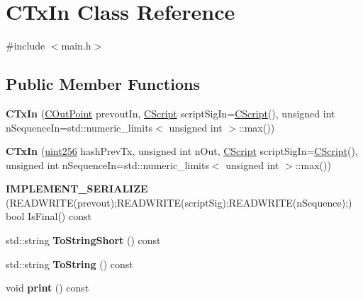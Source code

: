 \hypertarget{class_c_tx_in}{}\section{C\+Tx\+In Class Reference}
\label{class_c_tx_in}


{\ttfamily \#include $<$main.\+h$>$}

\subsection*{Public Member Functions}
\begin{DoxyCompactItemize}
\item 
\mbox{\label{class_c_tx_in_a243c4c394d5534ed10999b31d025be13}} 
{\bfseries C\+Tx\+In} (\mbox{\hyperlink{class_c_out_point}{C\+Out\+Point}} prevout\+In, \mbox{\hyperlink{class_c_script}{C\+Script}} script\+Sig\+In=\mbox{\hyperlink{class_c_script}{C\+Script}}(), unsigned int n\+Sequence\+In=std\+::numeric\+\_\+limits$<$ unsigned int $>$\+::max())
\item 
\mbox{\label{class_c_tx_in_a168382e68612df987e0241740771ab4e}} 
{\bfseries C\+Tx\+In} (\mbox{\hyperlink{classuint256}{uint256}} hash\+Prev\+Tx, unsigned int n\+Out, \mbox{\hyperlink{class_c_script}{C\+Script}} script\+Sig\+In=\mbox{\hyperlink{class_c_script}{C\+Script}}(), unsigned int n\+Sequence\+In=std\+::numeric\+\_\+limits$<$ unsigned int $>$\+::max())
\item 
\mbox{\label{class_c_tx_in_ac66b05906d62064e1161efa954994a57}} 
{\bfseries I\+M\+P\+L\+E\+M\+E\+N\+T\+\_\+\+S\+E\+R\+I\+A\+L\+I\+ZE} (R\+E\+A\+D\+W\+R\+I\+TE(prevout);R\+E\+A\+D\+W\+R\+I\+TE(script\+Sig);R\+E\+A\+D\+W\+R\+I\+TE(n\+Sequence);) bool Is\+Final() const
\item 
\mbox{\label{class_c_tx_in_aa6d16345a77762209f0d8970f6fd4429}} 
std\+::string {\bfseries To\+String\+Short} () const
\item 
\mbox{\label{class_c_tx_in_a9f3dcba8a979ca7007448f8ad1d3c4c1}} 
std\+::string {\bfseries To\+String} () const
\item 
\mbox{\label{class_c_tx_in_ab912b8ddc4410cdf16350b897cbcc6e2}} 
void {\bfseries print} () const
\end{DoxyCompactItemize}
